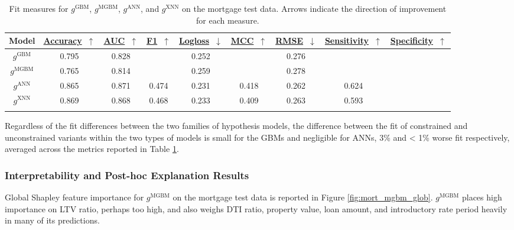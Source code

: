 \documentclass[information,article,submit,moreauthors,pdftex]{definitions/mdpi}
\begin{document}
\begin{table}[H]
	\caption{Fit measures for $g^\text{GBM}$, $g^\text{MGBM}$, $g^\text{ANN}$, and $g^\text{XNN}$ on the mortgage test data. Arrows indicate the direction of improvement for each measure.}
\centering
\begin{tabular}{ccccccccc}
	\toprule
	\textbf{Model} & 
	\href{https://scikit-learn.org/stable/modules/model_evaluation.html#accuracy-score}{\textbf{Accuracy}}~$\uparrow$ & \href{https://en.wikipedia.org/wiki/Receiver_operating_characteristic#Area_under_the_curve}{\textbf{AUC}}~$\uparrow$ & \href{https://en.wikipedia.org/wiki/F1_score}{\textbf{F1}}~$\uparrow$ & 
	\href{https://scikit-learn.org/stable/modules/model_evaluation.html#log-loss}{\textbf{Logloss}}~$\downarrow$ & \href{https://en.wikipedia.org/wiki/Matthews_correlation_coefficient}{\textbf{MCC}}~$\uparrow$ & \href{https://en.wikipedia.org/wiki/Root-mean-square_deviation}{\textbf{RMSE}}~$\downarrow$ & \href{https://en.wikipedia.org/wiki/Sensitivity_and_specificity}{\textbf{Sensitivity}}~$\uparrow$ & \href{https://en.wikipedia.org/wiki/Sensitivity_and_specificity}{\textbf{Specificity}}~$\uparrow$ \\
	\midrule	
$g^\text{GBM}$		& 0.795	& 0.828	& & 0.252 &	& 0.276 & & \\
$g^\text{MGBM}$		& 0.765	& 0.814	& & 0.259 &	& 0.278 & & \\
$g^\text{ANN}$		& 0.865	& 0.871	& 0.474 & 0.231 &	0.418 & 0.262 & 0.624 & \\
$g^\text{XNN}$		& 0.869	& 0.868	& 0.468 & 0.233 &	0.409 & 0.263 & 0.593 & \\
\bottomrule
\label{tab:mort_acc}
\end{tabular}
\end{table}

\noindent Regardless of the fit differences between the two families of hypothesis models, the difference between the fit of constrained and unconstrained variants within the two types of models is small for the GBMs and negligible for ANNs, 3\% and < 1\% worse fit respectively, averaged across the metrics reported in Table \ref{tab:mort_acc}. 

\subsubsection{Interpretability and Post-hoc Explanation Results}

Global Shapley feature importance for $g^\text{MGBM}$ on the mortgage test data is reported in Figure \ref{fig:mort_mgbm_glob}. $g^\text{MGBM}$ places high importance on LTV ratio, perhaps too high, and also weighs DTI ratio, property value, loan amount, and introductory rate period heavily in many of its predictions. 
\end{document}
